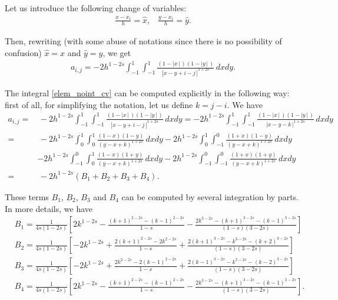 {Let us introduce the following change of variables:
\begin{align}\label{cv_appendix}
	\frac{x-x_i}{h}=\hat{x},\;\;\; \frac{y-x_i}{h}=\hat{y}.
\end{align}

Then, rewriting (with some abuse of notations since there is no possibility of confusion) $\hat{x}=x$ and $\hat{y}=y$, we get 
\begin{align}\label{elem_noint_cv}
	a_{i,j}=-2h^{1-2s} \int_{-1}^1\int_{-1}^1\frac{(1-|x\,|\,)(1-|y\,|\,)}{|x-y+i-j\,|^{1+2s}}\,dxdy.
\end{align}

The integral \eqref{elem_noint_cv} can be computed explicitly in the following way: first of all, for simplifying the notation, let us define $k=j-i$. We have 
\begin{align*}
	a_{i,j} = &\, -2h^{1-2s} \int_{-1}^1\int_{-1}^1\frac{(1-|x\,|\,)(1-|y\,|\,)}{|x-y+i-j\,|^{1+2s}}\,dxdy =-2h^{1-2s} \int_{-1}^1\int_{-1}^1\frac{(1-|x\,|\,)(1-|y\,|\,)}{|x-y-k\,|^{1+2s}}\,dxdy
	\\
	= &\, -2h^{1-2s} \int_0^1\int_0^1\frac{(1-x)(1-y)}{(y-x+k)^{1+2s}}\,dxdy - 2h^{1-2s} \int_0^1\int_{-1}^0\frac{(1+x)(1-y)}{(y-x+k)^{1+2s}}\,dxdy 
	\\
	&- 2h^{1-2s} \int_{-1}^0\int_0^1\frac{(1-x)(1+y)}{(y-x+k)^{1+2s}}\,dxdy - 2h^{1-2s} \int_{-1}^0\int_{-1}^0\frac{(1+x)(1+y)}{(y-x+k)^{1+2s}}\,dxdy
	\\
	= &\, - 2h^{1-2s}(B_1 + B_2 + B_3 + B_4).
\end{align*}

These terms $B_1$, $B_2$, $B_3$ and $B_4$ can be computed by several integration by parts. In more details, we have
\begin{align*}
	& B_1 = \frac{1}{4s(1-2s)}\left[2k^{1-2s}-\frac{(k+1)^{2-2s}-(k-1)^{2-2s}}{1-s}-\frac{2k^{3-2s}-(k+1)^{3-2s}-(k-1)^{3-2s}}{(1-s)(3-2s)}\right]
	\\
	& B_2 = \frac{1}{4s(1-2s)}\left[-2k^{1-2s}+\frac{2(k+1)^{2-2s}-2k^{2-2s}}{1-s}+\frac{2(k+1)^{3-2s}-k^{3-2s}-(k+2)^{3-2s}}{(1-s)(3-2s)}\right]
	\\
	& B_3 = \frac{1}{4s(1-2s)}\left[-2k^{1-2s}+\frac{2k^{2-2s}-2(k-1)^{2-2s}}{1-s}+\frac{2(k-1)^{3-2s}-k^{3-2s}-(k-2)^{3-2s}}{(1-s)(3-2s)}\right]
	\\
	& B_4 = \frac{1}{4s(1-2s)}\left[2k^{1-2s}-\frac{(k+1)^{2-2s}-(k-1)^{2-2s}}{1-s}-\frac{2k^{3-2s}-(k+1)^{3-2s}-(k-1)^{3-2s}}{(1-s)(3-2s)}\right].
\end{align*} 

}
